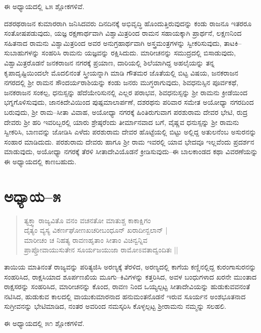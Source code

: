 ಈ ಅಧ್ಯಾಯದಲ್ಲಿ ೬೫ ಶ್ಲೋಕಗಳಿವೆ.

ದಶರಥರಾಜನ ಕುಮಾರರಾಗಿ ಜನಿಸಿದವರು ದಿನದಿನಕ್ಕೆ ಅಭಿವೃದ್ಧಿ ಹೊಂದುತ್ತಿರುವುದನ್ನು ಕಂಡು ರಾಜನೂ ಇತರರೂ ಸಂತೋಷಪಡುವುದು, ಯಜ್ಞ ರಕ್ಷಣಾರ್ಥವಾಗಿ ವಿಶ್ವಾಮಿತ್ರರಿಂದ ರಾಮನ ಸಹಾಯಕ್ಕಾಗಿ ಪ್ರಾರ್ಥನೆ, ಲಕ್ಷಣನಿಂದ ಸಹಿತನಾದ ರಾಮನು ವಿಶ್ವಾಮಿತ್ರರಿಂದ ಅವರ ಅನುಗ್ರಹಾರ್ಥವಾಗಿ ಅಸ್ತ್ರಮಂತ್ರಗಳನ್ನು ಸ್ವೀಕರಿಸುವುದು, ತಾಟಕಿ–ಸುಬಾಹುಗಳನ್ನು ಸಂಹರಿಸಿ ರಾಮನು ಯಜ್ಞವನ್ನು ರಕ್ಷಿಸಿದುದು. ಮಾರೀಚನನ್ನು ಸಮುದ್ರದಲ್ಲಿ ಬಿಸಾಡುವುದು, ವಿಶ್ವಾಮಿತ್ರರೊಡನೆ ಜನಕರಾಜನ ನಗರಕ್ಕೆ ಪ್ರಯಾಣ, ದಾರಿಯಲ್ಲಿ ಶಿಲೆಯಾಗಿದ್ದ ಅಹಲೈಯನ್ನು ತನ್ನ ಕೃಪಾದೃಷ್ಟಿಯಿಂದಲೇ ಮೊದಲಿನಂತೆ ಸ್ತ್ರೀಯನ್ನಾಗಿ ಮಾಡಿ ಗೌತಮರ ಜೊತೆಯಲ್ಲಿ ಬಿಟ್ಟ ವಿಷಯ, ಜನಕರಾಜನ ನಗರದಲ್ಲಿ ಶ‍್ರೀ ರಾಮನ ಸೌಂದರ್ಯರಾಶಿಯನ್ನು ಕಂಡು ಜನರು ಮುಗ್ಧರಾಗುವುದು, ಶಿವಧನುಸ್ಸಿನ ಪೂರ್ವಕಥೆ, ಜನಕರಾಜನ ಸಂಕಲ್ಪ, ಧನುಸ್ಸನ್ನು ಹೆದೆಯೇರಿಸುನಲ್ಲಿ ಎಲ್ಲರ ಪರಾಭವ, ಶಿವಧನುಸ್ಸನ್ನು ಶ‍್ರೀ ರಾಮನು ಕ್ರೀಡೆಯಿಂದ ಭಗ್ನಗೊಳಿಸುವುದು, ಜಾನಕಿದೇವಿಯಿಂದ ಪುಷ್ಪಮಾಲಾರ್ಪಣೆ, ದಶರಥನು ಪರಿವಾರ ಸಮೇತ ಅಯೋಧ್ಯಾ ನಗರದಿಂದ ಬರುವುದು, ಶ‍್ರೀ ರಾಮ–ಸೀತಾ ವಿವಾಹ, ಅಯೋಧ್ಯಾ ನಗರಕ್ಕೆ ಹಿಂತಿರುಗುವಾಗ ಪರಶುರಾಮ ದೇವರ ಭೇಟಿ, ರುದ್ರ ದೇವರು ಶ‍್ರೀ ಹರಿ ಇವರಿಬ್ಬರಲ್ಲಿ ಯಾರು ಶ್ರೇಷ್ಠರೆಂದು ತೀರ್ಮಾನವಾದ ಬಗೆ, ವೈಷ್ಣವ ಧನುಸ್ಸನ್ನು ಶ‍್ರೀ ರಾಮನು ಸ್ವೀಕರಿಸಿ, ಬಾಣವನ್ನು ಜೋಡಿಸಿ ಎಳೆದು ಪರಶುರಾಮ ದೇವರ ಹೊಟ್ಟೆಯಲ್ಲಿ ಬಿಟ್ಟು ಅಲ್ಲಿದ್ದ ಅತುಲನೆಂಬ ಅಸುರನನ್ನು ಸಂಹಾರ ಮಾಡಿದುದು. ಪರಶುರಾಮ ದೇವರು ಹಾಗೂ ಶ‍್ರೀ ರಾಮ ಇವರಲ್ಲಿ ಯಾವ ಭೇದವೂ ಇಲ್ಲವೆಂದು ಪ್ರದರ್ಶನ ಮಾಡುವುದು, ಅಯೋಧ್ಯಾ ನಗರಕ್ಕೆ ತೆರಳಿ ಸೀತಾದೇವಿಯೊಡನೆ ಕ್ರೀಡಿಸುವುದು–ಈ ಬಾಲಕಾಂಡದ ಕಥಾ ವಿವರಣೆಯನ್ನು ಈ ಅಧ್ಯಾಯದಲ್ಲಿ ಕಾಣಬಹುದು.


\section{ಅಧ್ಯಾಯ–೫}

\begin{verse}
ತ್ಯಕ್ತ್ವಾ ರಾಜ್ಯವಿತೊ ವನಂ ವಚನತೋ ಮಾತುಶ್ಚ ಕಾಕಾಕ್ಷಿಗಂ \\ ದೈತ್ಯಂ ವ್ಯಸ್ಯ ವಿಕರ್ಣಘೋಣಖಚರೀಬಂಧೂನ್ ಖರಾದೀನ್ಖಲಾನ್ |\\ ಮಾರೀಚಂ ಚ ನಿಹತ್ಯ ರಾವಣಹೃತಾಂ ಸೀತಾಂ ವಿಚಿನ್ವನ್ನಿವ \\ ಪ್ರಾಪ್ತೋವಾಯುಸುತೇನ ಸೂರ್ಯಜಯುಜಾ ರಾಮೋಽವತಾದ್ವಂದಿತಃ || 
\end{verse}

ತಾಯಿಯ ಮಾತಿನಂತೆ ರಾಜ್ಯವನ್ನು ಪರಿತ್ಯಜಿಸಿ ಅರಣ್ಯಕ್ಕೆ ತೆರಳಿದ, ಅರಣ್ಯದಲ್ಲಿ ಕಾಗೆಯ ಕಣ್ಣಿನಲ್ಲಿದ್ದ ಕುರಂಗಾಸುರನನ್ನು ಸಂಹರಿಸಿದ, ರಾಕ್ಷಸಿಯಾದ ಶೂರ್ಪಣಖಿಯ ಮೂಗು–ಕಿವಿಗಳನ್ನು ಕತ್ತರಿಸಿದ, ಅವಳ ಬಂಧುಗಳಾದ ಖರನೇ ಮುಂತಾದ ರಾಕ್ಷಸರನ್ನು ಸಂಹರಿಸಿದ, ಮಾರೀಚನನ್ನು ಕೊಂದ, ರಾವಣ ನಿಂದ ಒಯ್ಯಲ್ಪಟ್ಟ ಸೀತಾದೇವಿಯನ್ನು ಹುಡುಕುವವನಂತೆ ನಟಿಸಿದ, ಹುಡುಕುವ ಕಾಲದಲ್ಲಿ ವಾಯುಕುಮಾರನಾದ ಹನುಮಂತನೊಡನೆ ಇರುವ ಸೂರ್ಯನ ಅಂಶಭೂತನಾದ ಸುಗ್ರೀವನನ್ನು ಭೇಟಿಮಾಡಿದ, ನಂತರ ಅವರಿಂದ ನಮಸ್ಕರಿಸಿ ಕೊಳ್ಳಲ್ಪಟ್ಟ ಶ‍್ರೀರಾಮನು ನಮ್ಮನ್ನು ಸಲಹಲಿ.

ಈ ಅಧ್ಯಾಯದಲ್ಲಿ ೫೧ ಶ್ಲೋಕಗಳಿವೆ.

